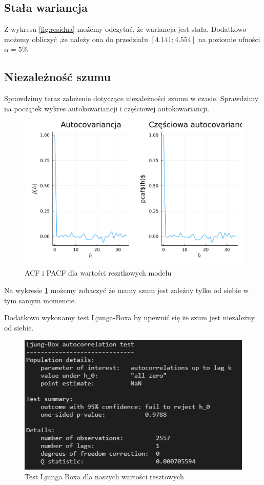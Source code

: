 \documentclass[12pt]{article}
\theoremstyle{exer}
\begin{document}
\subsection{Stała wariancja}
Z wykresu \ref{fig:residua} możemy odczytać, że wariancja jest stała. Dodatkowo możemy obliczyć ,że  należy ona do przedziału $[4.141 ; 4.554]$ na poziomie ufności $\alpha = 5\%$

\subsection{Niezależność szumu}
Sprawdzimy teraz założenie dotyczące niezależności szumu w czasie. Sprawdzimy na początek wykres autokowariancji i częściowej autokowariancji. 
\begin{figure}[H]
	\centering
	\includegraphics[width=3\columnwidth/4]{img/acf_pacf_residua.png}
	\caption{ACF i PACF dla wartości resztkowych modelu}
	\label{fig:residua_acf_pacf}
\end{figure}
Na wykresie \ref{fig:residua_acf_pacf} możemy  zobaczyć że mamy szum jest zależny tylko od siebie w tym samym momencie.

Dodatkowo wykonamy test Ljunga-Boxa by upewnić się że szum jest niezależny od siebie.
\begin{figure}[H]
	\centering
	\includegraphics[width=3\columnwidth/4]{img/Ljung-Box.png}
	\caption{Test Ljunga Boxa dla naszych wartości resztowych}
	\label{Test Ljunga Boxa}
\end{figure}
\end{document}
